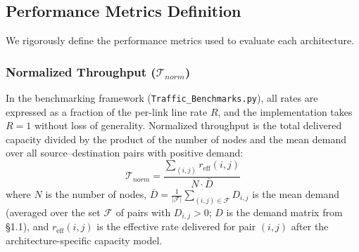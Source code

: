 \documentclass{article}
\begin{document}
    \subsection{Performance Metrics Definition}
    We rigorously define the performance metrics used to evaluate each architecture.

    \subsubsection{Normalized Throughput ($\mathcal{T}_{norm}$)}
    In the benchmarking framework (\texttt{Traffic\_Benchmarks.py}), all rates are expressed as a fraction of the per-link line rate $R$, and the implementation takes $R = 1$ without loss of generality. Normalized throughput is the total delivered capacity divided by the product of the number of nodes and the mean demand over all source--destination pairs with positive demand:
    \begin{equation}
        \mathcal{T}_{norm} = \frac{\sum_{(i,j)} r_{\text{eff}}(i,j)}{N \cdot \bar{D}}
    \end{equation}
    where $N$ is the number of nodes, $\bar{D} = \frac{1}{|\mathcal{F}|}\sum_{(i,j) \in \mathcal{F}} D_{i,j}$ is the mean demand (averaged over the set $\mathcal{F}$ of pairs with $D_{i,j} > 0$; $D$ is the demand matrix from \S1.1), and $r_{\text{eff}}(i,j)$ is the effective rate delivered for pair $(i,j)$ after the architecture-specific capacity model.
\end{document}
